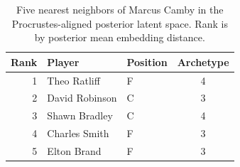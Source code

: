 \begin{table}[htbp]
  \centering\small
  \begin{tabular}{rllc}
    \toprule
    Rank & Player & Position & Archetype \\
    \midrule
    1 & Theo Ratliff & F & 4 \\
    2 & David Robinson & C & 3 \\
    3 & Shawn Bradley & C & 4 \\
    4 & Charles Smith & F & 3 \\
    5 & Elton Brand & F & 3 \\
    \bottomrule
  \end{tabular}
  \caption{Five nearest neighbors of Marcus Camby in the Procrustes-aligned posterior latent space. Rank is by posterior mean embedding distance.}
  \label{tab:Marcus_Camby_neighbors}
\end{table}


